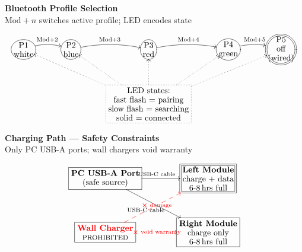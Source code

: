 \documentclass[border=10pt]{standalone}
\begin{document}
\begin{minipage}{16cm}
\vspace{12pt}


\begin{center}
\textbf{\large Bluetooth Profile Selection}\\[4pt]
\small $\mathrm{Mod}+n$ switches active profile; LED encodes state
\end{center}

\vspace{8pt}

\[
\xymatrix@R=2pc@C=2.5pc{
  *+[o][F-]{\txt{P1\\white}}
    \ar@/^/[r]^{\text{Mod+2}}
  &
  *+[o][F-]{\txt{P2\\blue}}
    \ar@/^/[r]^{\text{Mod+3}}
  &
  *+[o][F-]{\txt{P3\\red}}
    \ar@/^/[r]^{\text{Mod+4}}
  &
  *+[o][F-]{\txt{P4\\green}}
    \ar@/^/[r]^{\text{Mod+5}}
  &
  *+[o][F=]{\txt{P5\\off\\(wired)}}
  \\
  & & *+[F.]\txt{LED states:\\fast flash = pairing\\slow flash = searching\\solid = connected}
    \ar@{.>}[ull] \ar@{.>}[ul] \ar@{.>}[u] \ar@{.>}[ur] \ar@{.>}[urr]
}
\]


\vspace{12pt}

\begin{center}
\textbf{\large Charging Path — Safety Constraints}\\[4pt]
\small Only PC USB-A ports; wall chargers void warranty
\end{center}

\vspace{8pt}

\[
\xymatrix@R=2.5pc@C=3.5pc{
  *+[F]\txt{\textbf{PC USB-A Port}\\(safe source)}
    \ar@{->}[r]^{\text{USB-C cable}}
    \ar@{->}[dr]_{\text{USB-C cable}}
  &
  *+[F=]\txt{\textbf{Left Module}\\charge + data\\6{-}8\,hrs full}
  \\
  *+[F]\txt{\color{red}\textbf{Wall Charger}\\{\footnotesize PROHIBITED}}
    \ar@{-->}@[red][ur]|{\text{\color{red}$\boldsymbol\times$ damage}}
    \ar@{-->}@[red][r]|{\text{\color{red}$\boldsymbol\times$ void warranty}}
  &
  *+[F]\txt{\textbf{Right Module}\\charge only\\6{-}8\,hrs full}
}
\]

\end{minipage}
\end{document}
